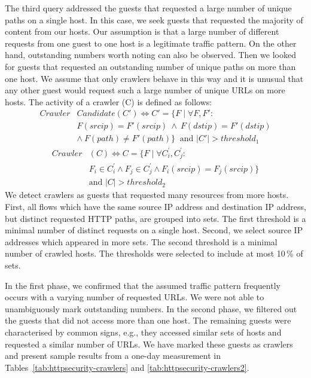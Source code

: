 The third query addressed the guests that requested a large number of unique paths on a single host. In this case, we seek guests that requested the majority of content from our hosts. Our assumption is that a large number of different requests from one guest to one host is a legitimate traffic pattern. On the other hand, outstanding numbers worth noting can also be observed. Then we looked for guests that requested an outstanding number of unique paths on more than one host. We assume that only crawlers behave in this way and it is unusual that any other guest would request such a large number of unique URLs on more hosts. The activity of a crawler (C) is defined as follows:
\begin{equation*}
\begin{split}
Crawler&Candidate(C') \iff C' = \{F \mid \forall F, F':\\
&F(srcip) = F'(srcip) \: \land \: F(dstip) = F'(dstip)\\
&\land \: F(path) \neq F'(path)\} \: \mbox{ and } |C'| > threshold_1
\end{split}
\end{equation*}
\begin{equation*}
\begin{split}
Crawler&(C) \iff C = \{F \mid \forall C^\prime_i, C^\prime_j:\\
&F_i \in C^\prime_i \land F_j \in C^\prime_j \land F_i(srcip) = F_j(srcip)\}\\
&\mbox{and } |C| > threshold_2
\end{split}
\end{equation*}
We detect crawlers as guests that requested many resources from more hosts. First, all flows which have the same source IP address and destination IP address, but distinct requested HTTP paths, are grouped into sets. The first threshold is a minimal number of distinct requests on a single host. Second, we select source IP addresses which appeared in more sets. The second threshold is a minimal number of crawled hosts. The thresholds were selected to include at most 10\,\% of sets.

In the first phase, we confirmed that the assumed traffic pattern frequently occurs with a varying number of requested URLs. We were not able to unambiguously mark outstanding numbers. In the second phase, we filtered out the guests that did not access more than one host. The remaining guests were characterised by common signs, e.g., they accessed similar sets of hosts and requested a similar number of URLs. We have marked these guests as crawlers and present sample results from a one-day measurement in Tables~\ref{tab:httpsecurity-crawlers} and \ref{tab:httpsecurity-crawlers2}.

